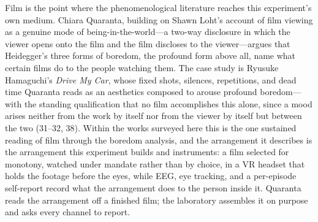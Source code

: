 Film is the point where the phenomenological literature reaches this experiment's own medium.
Chiara Quaranta, building on Shawn Loht's account of film viewing as a genuine mode of
being-in-the-world---a two-way disclosure in which the viewer opens onto the film and the
film discloses to the viewer---argues that Heidegger's three forms of boredom, the profound
form above all, name what certain films do to the people watching them. The case study is
Ryusuke Hamaguchi's \textit{Drive My Car}, whose fixed shots, silences, repetitions, and dead
time Quaranta reads as an aesthetics composed to arouse profound boredom---with the standing
qualification that no film accomplishes this alone, since a mood arises neither from the work
by itself nor from the viewer by itself but between the two (31--32, 38). Within the works
surveyed here this is the one sustained reading of film through the boredom analysis, and the
arrangement it describes is the arrangement this experiment builds and instruments: a film
selected for monotony, watched under mandate rather than by choice, in a VR headset that
holds the footage before the eyes, while EEG, eye tracking, and a per-episode self-report
record what the arrangement does to the person inside it. Quaranta reads the arrangement off
a finished film; the laboratory assembles it on purpose and asks every channel to report.
